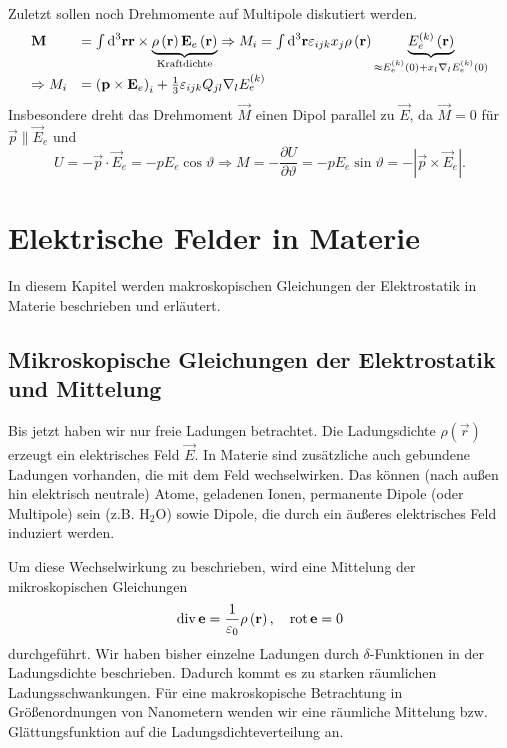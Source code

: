 Zuletzt sollen noch Drehmomente auf Multipole diskutiert werden.
\begin{equation*}
	\begin{array}{ll}
		\mathbf{M}          & =\int \text{d} ^{3}\mathbf{r}\mathbf{r}\times \underset{\text{Kraftdichte}}{\underbrace{\rho \left(\mathbf{r}\right)\mathbf{E}_{e}\left(\mathbf{r}\right)}}\Rightarrow M_{i}=\int \text{d} ^{3}\mathbf{r}\varepsilon _{ijk}x_{j}\rho \left(\mathbf{r}\right)\underset{\approx E_{e}^{\left(k\right)}\left(0\right)+x_{l}\nabla _{l}E_{e}^{\left(k\right)}\left(0\right)}{\underbrace{E_{e}^{\left(k\right)}\left(\mathbf{r}\right)}} \\
		\Rightarrow M_{i} & =\left(\mathbf{p}\times \mathbf{E}_{e}\right)_{i}+\frac{1}{3}\varepsilon _{ijk}Q_{jl}\nabla _{l}E_{e}^{\left(k\right)}
	\end{array}
\end{equation*}
Insbesondere dreht das Drehmoment $\vec {M}$ einen Dipol parallel zu $\vec {E}$, da $\vec {M}=0$ für $\vec {p}\parallel \vec {E}_{e}$ und
\begin{equation*}
	U=-\vec {p}\cdot \vec {E}_{e}=-pE_{e}\cos \vartheta \Rightarrow M=-\frac{\partial U}{\partial \vartheta }=-pE_{e}\sin \vartheta =-\left| \vec {p}\times \vec {E}_{e}\right| .
\end{equation*}
\chapter{Elektrische Felder in Materie\label{ref-035}}

In diesem Kapitel werden makroskopischen Gleichungen der Elektrostatik in Materie beschrieben und erläutert.

\section{Mikroskopische Gleichungen der Elektrostatik und Mittelung\label{ref-036}}

Bis jetzt haben wir nur freie Ladungen betrachtet. Die Ladungsdichte $\rho \left(\vec {r}\right)$ erzeugt ein elektrisches Feld $\vec {E}$. In Materie sind zusätzliche auch gebundene Ladungen vorhanden, die mit dem Feld wechselwirken. Das können (nach außen hin elektrisch neutrale) Atome, geladenen Ionen, permanente Dipole (oder Multipole) sein (z.B. $\mathrm{H}_{2}\mathrm{O}$) sowie Dipole, die durch ein äußeres elektrisches Feld induziert werden.

Um diese Wechselwirkung zu beschrieben, wird eine Mittelung der mikroskopischen Gleichungen
\begin{equation*}
	\operatorname{div} \mathbf{e}=\frac{1}{\varepsilon _{0}}\rho \left(\mathbf{r}\right),\quad \operatorname{rot} \mathbf{e}=0
\end{equation*}
durchgeführt. Wir haben bisher einzelne Ladungen durch $\delta $-Funktionen in der Ladungsdichte beschrieben. Dadurch kommt es zu starken räumlichen Ladungsschwankungen. Für eine makroskopische Betrachtung in Größenordnungen von Nanometern wenden wir eine räumliche Mittelung bzw. Glättungsfunktion auf die Ladungsdichteverteilung an.

